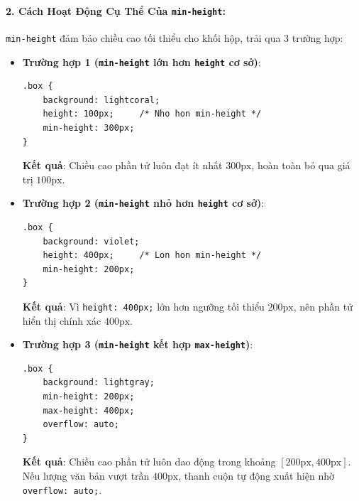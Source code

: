 \documentclass[11pt,oneside]{book}
\newcommand{\codeinline}[1]{\textcolor{accentOrange}{\texttt{#1}}}
\begin{document}
\paragraph{2. Cách Hoạt Động Cụ Thể Của \codeinline{min-height}:}
\codeinline{min-height} đảm bảo chiều cao tối thiểu cho khối hộp, trải qua 3 trường hợp:

\begin{itemize}[leftmargin=1.5em, itemsep=4pt, parsep=0pt]
    \item \textbf{Trường hợp 1 (\codeinline{min-height} lớn hơn \codeinline{height} cơ sở)}:
    \begin{codeWindow}
\begin{lstlisting}[language=CSS3]
.box {
    background: lightcoral;
    height: 100px;     /* Nho hon min-height */
    min-height: 300px;
}
\end{lstlisting}
    \end{codeWindow}
    \textbf{Kết quả}: Chiều cao phần tử luôn đạt ít nhất $300\text{px}$, hoàn toàn bỏ qua giá trị $100\text{px}$.

    \item \textbf{Trường hợp 2 (\codeinline{min-height} nhỏ hơn \codeinline{height} cơ sở)}:
    \begin{codeWindow}
\begin{lstlisting}[language=CSS3]
.box {
    background: violet;
    height: 400px;     /* Lon hon min-height */
    min-height: 200px;
}
\end{lstlisting}
    \end{codeWindow}
    \textbf{Kết quả}: Vì \codeinline{height: 400px;} lớn hơn ngưỡng tối thiểu $200\text{px}$, nên phần tử hiển thị chính xác $400\text{px}$.

    \item \textbf{Trường hợp 3 (\codeinline{min-height} kết hợp \codeinline{max-height})}:
    \begin{codeWindow}
\begin{lstlisting}[language=CSS3]
.box {
    background: lightgray;
    min-height: 200px;
    max-height: 400px;
    overflow: auto;
}
\end{lstlisting}
    \end{codeWindow}
    \textbf{Kết quả}: Chiều cao phần tử luôn dao động trong khoảng $[200\text{px}, 400\text{px}]$. Nếu lượng văn bản vượt trần $400\text{px}$, thanh cuộn tự động xuất hiện nhờ \codeinline{overflow: auto;}.


\end{itemize}
\end{document}
